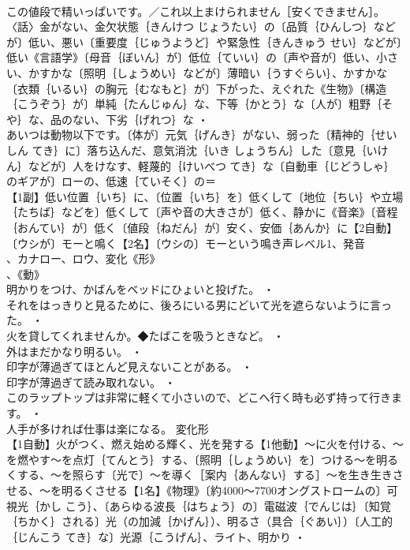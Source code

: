 \documentclass[8pt]{extreport}
\begin{document}
\begin{CJK}{UTF8}{min}
\\	この値段で精いっぱいです。／これ以上まけられません［安くできません］。〈話〉金がない、金欠状態｛きんけつ じょうたい｝の〔品質｛ひんしつ｝などが〕低い、悪い〔重要度｛じゅうようど｝や緊急性｛きんきゅう せい｝などが〕低い《言語学》〔母音｛ぼいん｝が〕低位｛ていい｝の〔声や音が〕低い、小さい、かすかな〔照明｛しょうめい｝などが〕薄暗い｛うすぐらい｝、かすかな〔衣類｛いるい｝の胸元｛むなもと｝が〕下がった、えぐれた《生物》〔構造｛こうぞう｝が〕単純｛たんじゅん｝な、下等｛かとう｝な〔人が〕粗野｛そや｝な、品のない、下劣｛げれつ｝な ・
\\	あいつは動物以下です。〔体が〕元気｛げんき｝がない、弱った〔精神的｛せいしん てき｝に〕落ち込んだ、意気消沈｛いき しょうちん｝した〔意見｛いけん｝などが〕人をけなす、軽蔑的｛けいべつ てき｝な〔自動車｛じどうしゃ｝のギアが〕ローの、低速｛ていそく｝の＝ 
\\	【1副】低い位置｛いち｝に、〔位置｛いち｝を〕低くして〔地位｛ちい｝や立場｛たちば｝などを〕低くして〔声や音の大きさが〕低く、静かに《音楽》〔音程｛おんてい｝が〕低く〔値段｛ねだん｝が〕安く、安価｛あんか｝に【2自動】〔ウシが〕モーと鳴く【2名】〔ウシの〕モーという鳴き声レベル1、発音
\\	、カナロー、ロウ、変化《形》
\\	、《動》
\\	明かりをつけ、かばんをベッドにひょいと投げた。 ・
\\	それをはっきりと見るために、後ろにいる男にどいて光を遮らないように言った。 ・
\\	火を貸してくれませんか。◆たばこを吸うときなど。 ・
\\	外はまだかなり明るい。 ・
\\	印字が薄過ぎてほとんど見えないことがある。 ・
\\	印字が薄過ぎて読み取れない。 ・
\\	このラップトップは非常に軽くて小さいので、どこへ行く時も必ず持って行きます。 ・
\\	人手が多ければ仕事は楽になる。	変化形 
\\	【1自動】火がつく、燃え始める輝く、光を発する【1他動】～に火を付ける、～を燃やす～を点灯｛てんとう｝する、〔照明｛しょうめい｝を〕つける～を明るくする、～を照らす〔光で〕～を導く［案内｛あんない｝する］～を生き生きさせる、～を明るくさせる【1名】《物理》〔約4000～7700オングストロームの〕可視光｛かし こう｝、〔あらゆる波長｛はちょう｝の〕電磁波｛でんじは｝〔知覚｛ちかく｝される〕光（の加減｛かげん｝）、明るさ（具合｛ぐあい｝）〔人工的｛じんこう てき｝な〕光源｛こうげん｝、ライト、明かり ・

\end{CJK}
\end{document}
